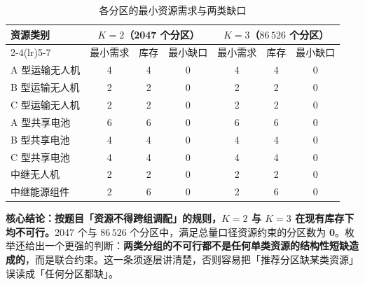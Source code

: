 \begin{table}[htbp]
	\caption{各分区的最小资源需求与两类缺口}
	\label{tab:q4-min}
	\centering
	\small
	\begin{tabular}{lcccccc}
		\toprule
		\multirow{2}{*}{资源类别} & \multicolumn{3}{c}{$K=2$（2047 个分区）} & \multicolumn{3}{c}{$K=3$（$86\,526$ 个分区）} \\
		\cmidrule(lr){2-4}\cmidrule(lr){5-7}
		 & 最小需求 & 库存 & 最小缺口 & 最小需求 & 库存 & 最小缺口 \\
		\midrule
		A 型运输无人机 & 4 & 4 & 0 & 4 & 4 & 0 \\
		B 型运输无人机 & 2 & 2 & 0 & 2 & 2 & 0 \\
		C 型运输无人机 & 2 & 2 & 0 & 2 & 2 & 0 \\
		A 型共享电池   & 6 & 6 & 0 & 6 & 6 & 0 \\
		B 型共享电池   & 4 & 4 & 0 & 4 & 4 & 0 \\
		C 型共享电池   & 4 & 4 & 0 & 4 & 4 & 0 \\
		中继无人机     & 2 & 2 & 0 & 2 & 2 & 0 \\
		中继能源组件   & 2 & 6 & 0 & 2 & 6 & 0 \\
		\bottomrule
	\end{tabular}
\end{table}

\textbf{核心结论：按题目「资源不得跨组调配」的规则，$K=2$ 与 $K=3$ 在现有库存下均不可行。}2047 个与 $86\,526$ 个分区中，满足总量口径资源约束的分区数为 \textbf{0}。枚举还给出一个更强的判断：\textbf{两类分组的不可行都不是任何单类资源的结构性短缺造成的}，而是联合约束。这一条须逐层讲清楚，否则容易把「推荐分区缺某类资源」误读成「任何分区都缺」。

